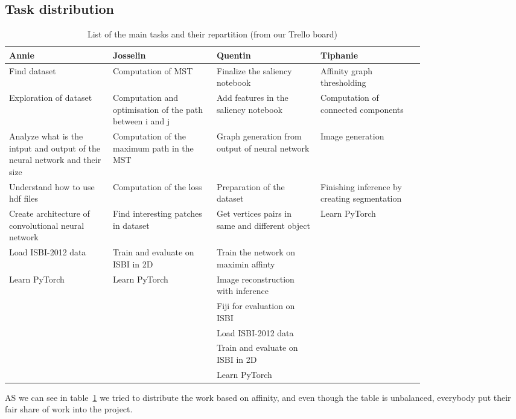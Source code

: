 \subsection{Task distribution}

\begin{table}[!hbtp]
	\centering
	\begin{tabular}{ |p{0.2\linewidth}|p{0.2\linewidth}|p{0.2\linewidth}|p{0.2\linewidth}| } 
		\hline
		Annie & Josselin & Quentin & Tiphanie \\
		\hline
		Find dataset & Computation of MST & Finalize the saliency notebook & Affinity graph thresholding \\ 
		\hline
		Exploration of dataset & Computation and optimisation of the path between i and j & Add features in the saliency notebook & Computation of connected components \\ 
		\hline
		Analyze what is the intput and output of the neural network and their size & Computation of the maximum path in the MST & Graph generation from output of neural network & Image generation \\ 
		\hline
		Understand how to use hdf files & Computation of the loss & Preparation of the dataset & Finishing inference by creating segmentation \\
		\hline
		Create architecture of convolutional neural network & Find interesting patches in dataset & Get vertices pairs in same and different object & Learn PyTorch\\
		\hline
		Load ISBI-2012 data & Train and evaluate on ISBI in 2D & Train the network on maximin affinty & \\
		\hline
		Learn PyTorch & Learn PyTorch & Image reconstruction with inference & \\
		\hline
		  & & Fiji for evaluation on ISBI & \\
		  \hline
		  & & Load ISBI-2012 data & \\
		  \hline
		  & & Train and evaluate on ISBI in 2D & \\
		  \hline
		  & & Learn PyTorch & \\
		  \hline
	\end{tabular}
	\caption{List of the main tasks and their repartition (from our Trello board)}
	\label{tab:tasks}
\end{table}

AS we can see in table~\ref{tab:tasks} we tried to distribute the work based on
affinity, and even though the table is unbalanced, everybody put their fair
share of work into the project.\\

